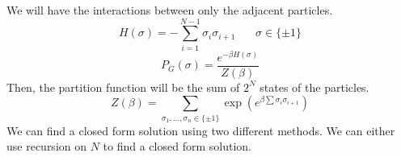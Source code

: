 \documentclass[11pt]{article}
\begin{document}
We will have the interactions between only the adjacent particles.
\[H(\sigma) = -\sum_{i=1}^{N-1} \sigma_i \sigma_{i+1} ~ ~ ~ ~ ~ ~ ~ ~ \sigma \in \{\pm 1\}\]
\[ P_G(\sigma) = \frac{e^{-\beta H(\sigma)}}{Z(\beta)}\]
Then, the partition function will be the sum of $2^N$ states of the particles.
\[ Z(\beta) = \sum_{\sigma_1, \dots, \sigma_n \in \{\pm 1\}} \exp\left( e^{ \beta \sum \sigma_i \sigma_{i+1}} \right)\]
We can find a closed form solution using two different methods. We can either use recursion on $N$ to find a closed form solution. 
\end{document}
